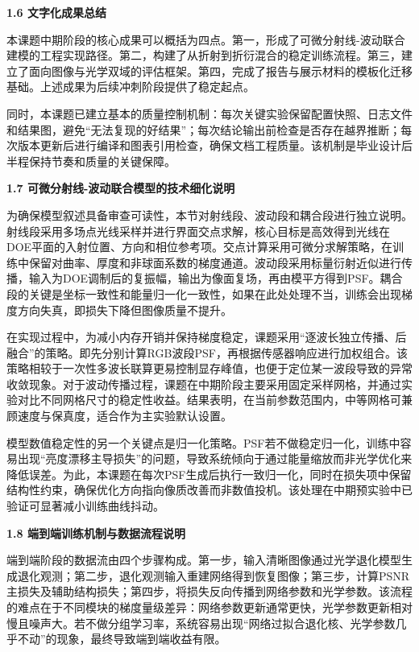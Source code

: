 \documentclass[UTF8,12pt,fontset=fandol]{ctexart}
\newcommand{\hfirst}[1]{%
\vspace{0.6em}
\noindent\textbf{#1}\par
}
\begin{document}
\hfirst{1.6 文字化成果总结}
本课题中期阶段的核心成果可以概括为四点。第一，形成了可微分射线-波动联合建模的工程实现路径。第二，构建了从折射到折衍混合的稳定训练流程。第三，建立了面向图像与光学双域的评估框架。第四，完成了报告与展示材料的模板化迁移基础。上述成果为后续冲刺阶段提供了稳定起点。

同时，本课题已建立基本的质量控制机制：每次关键实验保留配置快照、日志文件和结果图，避免“无法复现的好结果”；每次结论输出前检查是否存在越界推断；每次版本更新后进行编译和图表引用检查，确保文档工程质量。该机制是毕业设计后半程保持节奏和质量的关键保障。

\hfirst{1.7 可微分射线-波动联合模型的技术细化说明}

为确保模型叙述具备审查可读性，本节对射线段、波动段和耦合段进行独立说明。射线段采用多场点光线采样并进行界面交点求解，核心目标是高效得到光线在DOE平面的入射位置、方向和相位参考项。交点计算采用可微分求解策略，在训练中保留对曲率、厚度和非球面系数的梯度通道。波动段采用标量衍射近似进行传播，输入为DOE调制后的复振幅，输出为像面复场，再由模平方得到PSF。耦合段的关键是坐标一致性和能量归一化一致性，如果在此处处理不当，训练会出现梯度方向失真，即损失下降但图像质量不提升。



在实现过程中，为减小内存开销并保持梯度稳定，课题采用“逐波长独立传播、后融合”的策略。即先分别计算RGB波段PSF，再根据传感器响应进行加权组合。该策略相较于一次性多波长联算更易控制显存峰值，也便于定位某一波段导致的异常收敛现象。对于波动传播过程，课题在中期阶段主要采用固定采样网格，并通过实验对比不同网格尺寸的稳定性收益。结果表明，在当前参数范围内，中等网格可兼顾速度与保真度，适合作为主实验默认设置。



模型数值稳定性的另一个关键点是归一化策略。PSF若不做稳定归一化，训练中容易出现“亮度漂移主导损失”的问题，导致系统倾向于通过能量缩放而非光学优化来降低误差。为此，本课题在每次PSF生成后执行一致归一化，同时在损失项中保留结构性约束，确保优化方向指向像质改善而非数值投机。该处理在中期预实验中已验证可显著减小训练曲线抖动。



\hfirst{1.8 端到端训练机制与数据流程说明}

端到端阶段的数据流由四个步骤构成。第一步，输入清晰图像通过光学退化模型生成退化观测；第二步，退化观测输入重建网络得到恢复图像；第三步，计算PSNR主损失及辅助结构损失；第四步，将损失反向传播到网络参数和光学参数。该流程的难点在于不同模块的梯度量级差异：网络参数更新通常更快，光学参数更新相对慢且噪声大。若不做分组学习率，系统容易出现“网络过拟合退化核、光学参数几乎不动”的现象，最终导致端到端收益有限。
\end{document}
